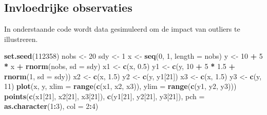 \documentclass[
  12pt,dutch,coursenotes]{book}
\newenvironment{Shaded}{\begin{snugshade}}{\end{snugshade}}
\newcommand{\DataTypeTok}[1]{\textcolor[rgb]{0.13,0.29,0.53}{#1}}
\newcommand{\DecValTok}[1]{\textcolor[rgb]{0.00,0.00,0.81}{#1}}
\newcommand{\FloatTok}[1]{\textcolor[rgb]{0.00,0.00,0.81}{#1}}
\newcommand{\KeywordTok}[1]{\textcolor[rgb]{0.13,0.29,0.53}{\textbf{#1}}}
\newcommand{\NormalTok}[1]{#1}
\newcommand{\OperatorTok}[1]{\textcolor[rgb]{0.81,0.36,0.00}{\textbf{#1}}}
\newcommand{\StringTok}[1]{\textcolor[rgb]{0.31,0.60,0.02}{#1}}
\theoremstyle{definition}
\theoremstyle{definition}
\theoremstyle{definition}
\theoremstyle{remark}
\begin{document}
\hypertarget{invloedrijke-observaties}{%
\subsection{Invloedrijke observaties}\label{invloedrijke-observaties}}

In onderstaande code wordt data gesimuleerd om de impact van outliers te illustreren.

\begin{Shaded}
\begin{Highlighting}[]
\KeywordTok{set.seed}\NormalTok{(}\DecValTok{112358}\NormalTok{)}
\NormalTok{nobs \textless{}{-}}\StringTok{ }\DecValTok{20}
\NormalTok{sdy \textless{}{-}}\StringTok{ }\DecValTok{1}
\NormalTok{x \textless{}{-}}\StringTok{ }\KeywordTok{seq}\NormalTok{(}\DecValTok{0}\NormalTok{, }\DecValTok{1}\NormalTok{, }\DataTypeTok{length =}\NormalTok{ nobs)}
\NormalTok{y \textless{}{-}}\StringTok{ }\DecValTok{10} \OperatorTok{+}\StringTok{ }\DecValTok{5} \OperatorTok{*}\StringTok{ }\NormalTok{x }\OperatorTok{+}\StringTok{ }\KeywordTok{rnorm}\NormalTok{(nobs, }\DataTypeTok{sd =}\NormalTok{ sdy)}
\NormalTok{x1 \textless{}{-}}\StringTok{ }\KeywordTok{c}\NormalTok{(x, }\FloatTok{0.5}\NormalTok{)}
\NormalTok{y1 \textless{}{-}}\StringTok{ }\KeywordTok{c}\NormalTok{(y, }\DecValTok{10} \OperatorTok{+}\StringTok{ }\DecValTok{5} \OperatorTok{*}\StringTok{ }\FloatTok{1.5} \OperatorTok{+}\StringTok{ }\KeywordTok{rnorm}\NormalTok{(}\DecValTok{1}\NormalTok{, }\DataTypeTok{sd =}\NormalTok{ sdy))}
\NormalTok{x2 \textless{}{-}}\StringTok{ }\KeywordTok{c}\NormalTok{(x, }\FloatTok{1.5}\NormalTok{)}
\NormalTok{y2 \textless{}{-}}\StringTok{ }\KeywordTok{c}\NormalTok{(y, y1[}\DecValTok{21}\NormalTok{])}
\NormalTok{x3 \textless{}{-}}\StringTok{ }\KeywordTok{c}\NormalTok{(x, }\FloatTok{1.5}\NormalTok{)}
\NormalTok{y3 \textless{}{-}}\StringTok{ }\KeywordTok{c}\NormalTok{(y, }\DecValTok{11}\NormalTok{)}
\KeywordTok{plot}\NormalTok{(x, y, }\DataTypeTok{xlim =} \KeywordTok{range}\NormalTok{(}\KeywordTok{c}\NormalTok{(x1, x2, x3)), }\DataTypeTok{ylim =} \KeywordTok{range}\NormalTok{(}\KeywordTok{c}\NormalTok{(y1, }
\NormalTok{    y2, y3)))}
\KeywordTok{points}\NormalTok{(}\KeywordTok{c}\NormalTok{(x1[}\DecValTok{21}\NormalTok{], x2[}\DecValTok{21}\NormalTok{], x3[}\DecValTok{21}\NormalTok{]), }\KeywordTok{c}\NormalTok{(y1[}\DecValTok{21}\NormalTok{], y2[}\DecValTok{21}\NormalTok{], }
\NormalTok{    y3[}\DecValTok{21}\NormalTok{]), }\DataTypeTok{pch =} \KeywordTok{as.character}\NormalTok{(}\DecValTok{1}\OperatorTok{:}\DecValTok{3}\NormalTok{), }\DataTypeTok{col =} \DecValTok{2}\OperatorTok{:}\DecValTok{4}\NormalTok{)}

\end{Highlighting}
\end{Shaded}
\end{document}
